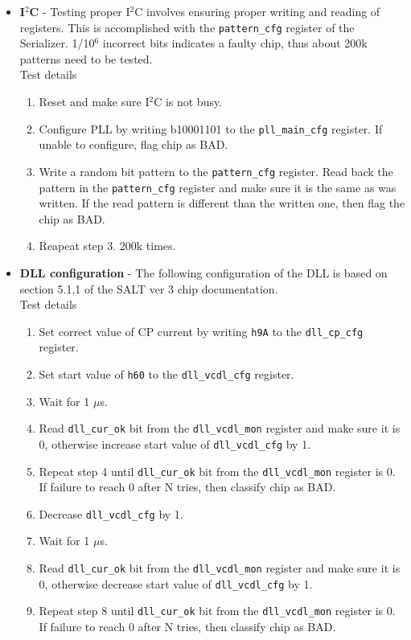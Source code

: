\documentclass{lhcbnote}
\begin{document}
\begin{itemize}
\item \textbf{I$^2$C} - Testing proper I$^2$C involves ensuring proper writing and reading of registers. This is accomplished with the \texttt{pattern\_cfg} register of the Serializer. 1/10$^6$ incorrect bits indicates a faulty chip, thus about 200k patterns need to be tested. \\
Test details
\begin{enumerate}
\item Reset and make sure I$^2$C is not busy.
\item Configure PLL by writing b10001101 to the \texttt{pll\_main\_cfg} register. If unable to configure, flag chip as BAD. 
\item Write a random bit pattern to the \texttt{pattern\_cfg} register. Read back the pattern in the \texttt{pattern\_cfg} register and make sure it is the same as was written. If the read pattern is different than the written one, then flag the chip as BAD.
\item Reapeat step 3. 200k times.
\end{enumerate}
\item \textbf{DLL configuration} - The following configuration of the DLL is based on section 5.1.1 of the SALT ver 3 chip documentation. \\
Test details
\begin{enumerate}
\item Set correct value of CP current by writing \texttt{h9A} to the \texttt{dll\_cp\_cfg} register.
\item Set start value of \texttt{h60} to the \texttt{dll\_vcdl\_cfg} register.
\item Wait for 1 $\mu$s.
\item Read \texttt{dll\_cur\_ok} bit from the \texttt{dll\_vcdl\_mon} register and make sure it is 0, otherwise increase start value of \texttt{dll\_vcdl\_cfg} by 1.
\item Repeat step 4 until \texttt{dll\_cur\_ok} bit from the \texttt{dll\_vcdl\_mon} register is 0. If failure to reach 0 after N tries, then classify chip as BAD.
\item Decrease \texttt{dll\_vcdl\_cfg} by 1.
\item Wait for 1 $\mu$s.
\item Read \texttt{dll\_cur\_ok} bit from the \texttt{dll\_vcdl\_mon} register and make sure it is 0, otherwise decrease start value of \texttt{dll\_vcdl\_cfg} by 1.
\item Repeat step 8 until \texttt{dll\_cur\_ok} bit from the \texttt{dll\_vcdl\_mon} register is 0. If failure to reach 0 after N tries, then classify chip as BAD.

\end{enumerate}
\end{itemize}
\end{document}

